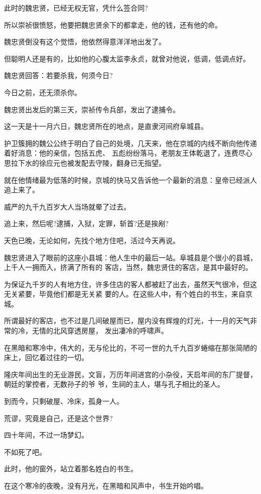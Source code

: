 \documentclass[11pt,a4paper,onecolumn]{article}
\begin{document}
此时的魏忠贤，已经无权无官，凭什么签合同?

所以崇祯很愤怒，他要把魏忠贤余下的都拿走，他的钱，还有他的命。

魏忠贤倒没有这个觉悟，他依然得意洋洋地出发了。

但聪明人还是有的，比如他的心腹太监李永贞，就曾对他说，低调，低调点好。

魏忠贤回答：若要杀我，何须今日?

今日之前，还无须杀你。

魏忠贤出发后的第三天，崇祯传令兵部，发出了逮捕令。

这一天是十一月六日，魏忠贤所在的地点，是直隶河间府阜城县。

护卫簇拥的魏公公终于明白了自己的处境，几天来，他在京城的内线不断向他传递着好消息：他的亲信，包括五虎、
五彪纷纷落马，老朋友王体乾退了，连费尽心思拉下水的徐应元也被发配去守陵，翻身已无指望。

就在他情绪最为低落的时候，京城的快马又告诉他一个最新的消息：皇帝已经派人追上来了。

威严的九千九百岁大人当场就晕了过去。

追上来，然后呢?逮捕，入狱，定罪，斩首?还是挨剐?

天色已晚，无论如何，先找个地方住吧，活过今天再说。

魏忠贤进入了眼前的这座小县城：他人生中的最后一站。阜城县是个很小的县城，上千人一拥而入，挤满了所有的
客店，当然，魏忠贤住的客店，是其中最好的。

为保证九千岁的人有地方住，许多住店的客人都被赶了出去，虽然天气很冷，但这无关紧要，毕竟他们都是无关紧
要的人。在这些人中，有个姓白的书生，来自京城。

所谓最好的客店，也不过是几间破屋而已，屋内没有辉煌的灯光，十一月的天气非常的冷，无情的北风穿透房屋，
发出凄冷的呼啸声。

在黑暗和寒冷中，伟大的，无与伦比的，不可一世的九千九百岁蜷缩在那张简陋的床上，回忆着过往的一切。

隆庆年间出生的无业游民，文盲，万历年间进宫的小杂役，天启年间的东厂提督，朝廷的掌控者，无数孙子的爷
爷，生祠的主人，堪与孔子相比的圣人。

到而今，只剩破屋、冷床，孤身一人。

荒谬，究竟是自己，还是这个世界?

四十年间，不过一场梦幻。

不如死了吧。

此时，他的窗外，站立着那名姓白的书生。

在这个寒冷的夜晚，没有月光，在黑暗和风声中，书生开始吟唱。
\end{document}
